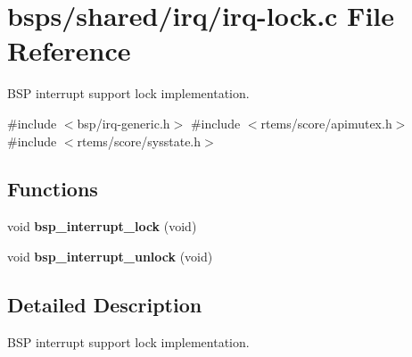 \hypertarget{irq-lock_8c}{}\section{bsps/shared/irq/irq-\/lock.c File Reference}
\label{irq-lock_8c}


B\+SP interrupt support lock implementation.  


{\ttfamily \#include $<$bsp/irq-\/generic.\+h$>$}\newline
{\ttfamily \#include $<$rtems/score/apimutex.\+h$>$}\newline
{\ttfamily \#include $<$rtems/score/sysstate.\+h$>$}\newline
\subsection*{Functions}
\begin{DoxyCompactItemize}
\item 
\mbox{\label{irq-lock_8c_ab75d8a53e54d74ff856b3575fd9b31b3}} 
void {\bfseries bsp\+\_\+interrupt\+\_\+lock} (void)
\item 
\mbox{\label{irq-lock_8c_ac03ee575b40103f0977a23845fca158b}} 
void {\bfseries bsp\+\_\+interrupt\+\_\+unlock} (void)
\end{DoxyCompactItemize}


\subsection{Detailed Description}
B\+SP interrupt support lock implementation. 

